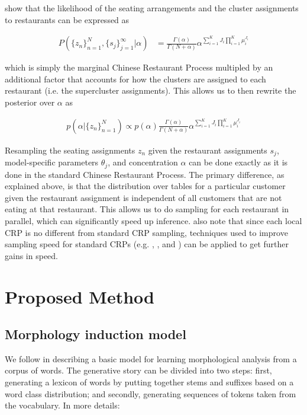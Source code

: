 \documentclass{article}
\begin{document}
\cite{lovell2012} show that the likelihood of the seating arrangements
and the cluster assignments to restaurants can be expressed as

\begin{align}
  P(\{z_n\}_{n=1}^N, \{s_j\}_{j=1}^\infty | \alpha) &=
  \frac{\Gamma(\alpha)}{\Gamma(N + \alpha)} \alpha^{\sum_{i=1}^K J_i \prod_{i=1}^K \mu_i^{J_i}}
\end{align}

which is simply the marginal Chinese Restaurant Process multipled by
an additional factor that accounts for how the clusters are assigned
to each restaurant (i.e. the supercluster assignments). This allows us
to then rewrite the posterior over $\alpha$ as

\begin{align}
  p(\alpha | \{z_n\}_{n=1}^N) \propto p(\alpha) \frac{\Gamma(\alpha)}{\Gamma(N + \alpha)} \alpha^{\sum_{i=1}^K J_i \prod_{i=1}^K \mu_i^{J_i}}
\end{align}

Resampling the seating assignments $z_n$ given the restaurant
assignments $s_j$, model-specific parameters $\theta_j$, and
concentration $\alpha$ can be done exactly as it is done in the
standard Chinese Restaurant Process. The primary difference, as
explained above, is that the distribution over tables for a particular
customer given the restaurant assignment is independent of all
customers that are not eating at that restaurant. This allows us to do
sampling for each restaurant in parallel, which can significantly
speed up inference. \cite{lovell2012} also note that since each local
CRP is no different from standard CRP sampling, techniques used to
improve sampling speed for standard CRPs (e.g. \cite{neal2000},
\cite{walker2007}, and \cite{papaspiliopoulos2008}) can be applied to
get further gains in speed.

\section{Proposed Method}
\label{sec:proposed-method}

\subsection{Morphology induction model}

We follow \cite{goldwater2011} in describing a basic model for
learning morphological analysis from a corpus of words. The generative
story can be divided into two steps: first, generating a lexicon of
words by putting together stems and suffixes based on a word class
distribution; and secondly, generating sequences of tokens taken from
the vocabulary. In more details:
\end{document}
